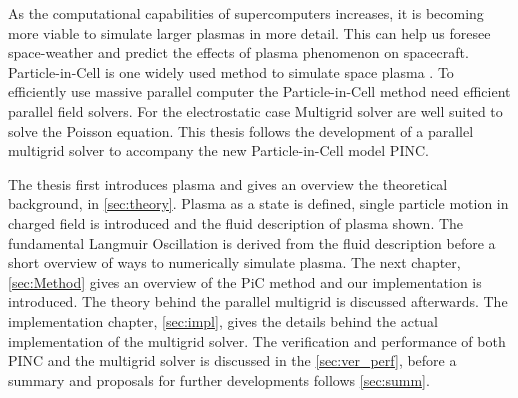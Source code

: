 
	As the computational capabilities of supercomputers increases, it is becoming more
	viable to simulate larger plasmas in more detail. This can help us foresee space-weather
 	and predict the effects of plasma phenomenon on spacecraft. Particle-in-Cell is one widely used
	method to simulate space plasma \citep{lapenta_particle_2012}.	To efficiently use
	massive parallel computer the Particle-in-Cell method need efficient parallel
	field solvers. For the electrostatic case Multigrid solver are well suited to
	solve the Poisson equation. This thesis follows the development of a parallel
	multigrid solver to accompany the new Particle-in-Cell model PINC.

 	The thesis first introduces plasma and gives an overview the theoretical background, in \cref{sec:theory}.
	Plasma as a state is defined, single particle motion in charged field is introduced and the fluid
	description of plasma shown. The fundamental Langmuir Oscillation is derived from the fluid
	description before a short overview of ways to numerically simulate plasma.
	The next chapter, \cref{sec:Method} gives an overview of the PiC method and our implementation
	is introduced. The theory behind the parallel multigrid is discussed afterwards.
	The implementation chapter, \cref{sec:impl}, gives the details behind the actual implementation
	of the multigrid solver.
	The verification and performance of both PINC and the multigrid solver is discussed in the \cref{sec:ver_perf},
	before a summary and proposals for further developments follows \cref{sec:summ}.
